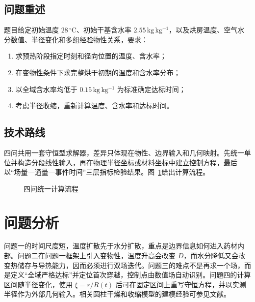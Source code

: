 \documentclass[withoutpreface,bwprint]{cumcmthesis}
\begin{document}
\subsection{问题重述}
题目给定初始温度 $28\,^{\circ}\mathrm{C}$、初始干基含水率 $2.55\,\mathrm{kg\,kg^{-1}}$，以及烘房温度、空气水分数值、半径变化和多组经验物性关系，要求：
\begin{enumerate}
  \item 求预热阶段指定时刻和径向位置的温度、含水率；
  \item 在变物性条件下求完整烘干初期的温度和含水率分布；
  \item 以全域含水率均低于 $0.15\,\mathrm{kg\,kg^{-1}}$ 为标准确定达标时间；
  \item 考虑半径收缩，重新计算温度、含水率和达标时间。
\end{enumerate}

\subsection{技术路线}
四问共用一套守恒型求解器，差异只体现在物性、边界输入和几何映射。先统一单位并构造分段线性输入，再在物理半径坐标或材料坐标中建立控制方程，最后以“场量—通量—事件时间”三层指标检验结果。图~\ref{fig:workflow}给出计算流程。
\begin{figure}[H]
\centering
{}
\caption{四问统一计算流程}
\label{fig:workflow}
\end{figure}

\section{问题分析}
问题一的时间尺度短，温度扩散先于水分扩散，重点是边界信息如何进入药材内部。问题二在问题一框架上引入变物性，温度升高会改变 $D$，而水分降低又会改变热储存与导热能力，因而必须进行双场迭代。问题三的难点不是再求一个场，而是定义“全域严格达标”并定位首次穿越，控制点由数值场自动识别。问题四的计算区间随半径变化，使用 $\xi=r/R(t)$ 后可在固定区间上重写守恒方程，并以实测半径作为外部几何输入。相关圆柱干燥和收缩模型的建模经验可参见文献\cite{silva2014boundary,silva2014thermophysical,simal1998shrinking,adrover2020moving}。
\end{document}
